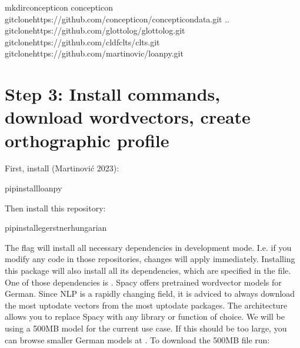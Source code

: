 \documentclass[letterpaper,10pt,english]{sphinxmanual}
\begin{document}
{{{{\begin{sphinxVerbatim}[commandchars=\\\{\}]
mkdirconcepticon
concepticon
gitclonehttps://github.com/concepticon/concepticon\PYGZhy{}data.git
..
gitclonehttps://github.com/glottolog/glottolog.git
gitclonehttps://github.com/cldf\PYGZhy{}clts/clts.git
gitclonehttps://github.com/martino\PYGZhy{}vic/loanpy.git
\end{sphinxVerbatim}


\section{Step 3: Install commands, download wordvectors, create orthographic profile}
\label{\detokenize{mkcldf:step-3-install-commands-download-wordvectors-create-orthographic-profile}}
\sphinxAtStartPar
First, install 
(Martinović 2023):

\begin{sphinxVerbatim}[commandchars=\\\{\}]
pipinstallloanpy
\end{sphinxVerbatim}

\sphinxAtStartPar
Then install this repository:

\begin{sphinxVerbatim}[commandchars=\\\{\}]
pipinstall\PYGZhy{}egerstnerhungarian
\end{sphinxVerbatim}

\sphinxAtStartPar
The  flag will install all necessary dependencies in development mode.
I.e. if you modify any code in those repositories, changes will apply
immediately.
Installing this package will also install all its dependencies,
which are specified in the  file. One of those
dependencies is
. Spacy offers pre\sphinxhyphen{}trained
wordvector models for German. Since NLP is a rapidly changing field, it is
adviced
to always download the most up\sphinxhyphen{}to\sphinxhyphen{}date vectors from the most up\sphinxhyphen{}to\sphinxhyphen{}date
packages. The architecture allows you to replace Spacy with any library
or function of choice. We will be using a 500MB model for the current
use case. If this should be too large, you can browse smaller German models at
. To download the 500MB file run:

}}}}
\end{document}
